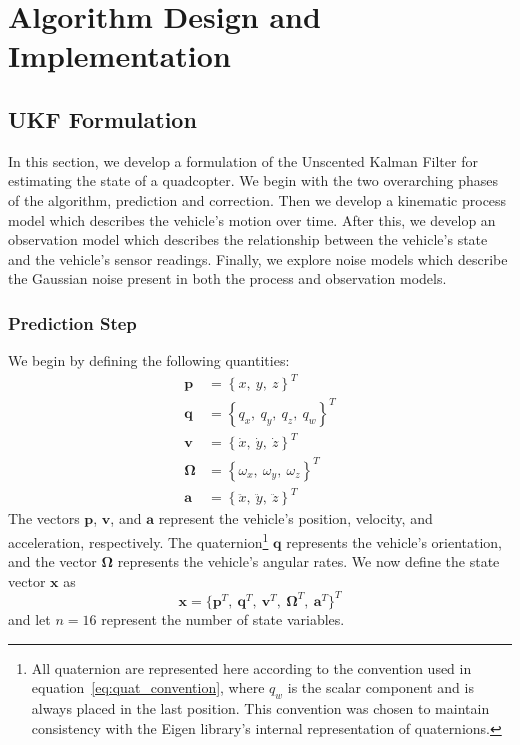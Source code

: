 \chapter{Algorithm Design and Implementation} \label{ch:Alg_Design}

\section{UKF Formulation} \label{sec:ukf_formulation}

In this section, we develop a formulation of the Unscented Kalman Filter for estimating the state of a quadcopter. We begin with the two overarching phases of the algorithm, prediction and correction. Then we develop a kinematic process model which describes the vehicle's motion over time. After this, we develop an observation model which describes the relationship between the vehicle's state and the vehicle's sensor readings. Finally, we explore noise models which describe the Gaussian noise present in both the process and observation models.

\subsection{Prediction Step} \label{sec:Prediction_Step}

We begin by defining the following quantities:
%
\begin{align} \label{eq:state_vars}
\mathbf{p} &= \left\lbrace x,\ y,\ z \right\rbrace ^{T} \\
\mathbf{q} &= \left\lbrace q_{x},\ q_{y},\ q_{z},\ q_{w} \right\rbrace ^{T} \label{eq:quat_convention} \\
\mathbf{v} &= \left\lbrace \dot{x},\ \dot{y},\ \dot{z} \right\rbrace ^{T} \\
\bm{\Omega} &= \left\lbrace \omega_{x},\ \omega_{y},\ \omega_{z} \right\rbrace ^{T} \\
\mathbf{a} &= \left\lbrace \ddot{x},\ \ddot{y},\ \ddot{z} \right\rbrace ^{T}
\end{align}
%
The vectors $\mathbf{p}$, $\mathbf{v}$, and $\mathbf{a}$ represent the vehicle's position, velocity, and acceleration, respectively. The quaternion\footnote{All quaternion are represented here according to the convention used in equation~\ref{eq:quat_convention}, where $q_{w}$ is the scalar component and is always placed in the last position. This convention was chosen to maintain consistency with the Eigen library's internal representation of quaternions.} $\mathbf{q}$ represents the vehicle's orientation, and the vector $\bm{\Omega}$ represents the vehicle's angular rates. We now define the state vector $\mathbf{x}$ as
%
\begin{equation}
\mathbf{x} = 
\Big\{
    \mathbf{p}^{T},\
    \mathbf{q}^{T},\
    \mathbf{v}^{T},\
    \bm{\Omega}^{T},\
    \mathbf{a}^{T}
\Big\} ^{T}
\end{equation}
%
and let $n = 16$ represent the number of state variables.

